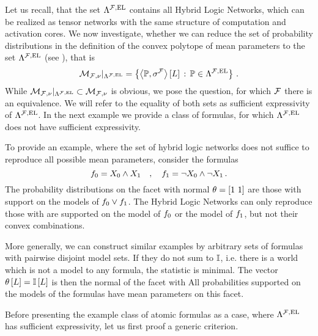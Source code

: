 Let us recall, that the set $\Lambda^{\mathcal{F},\mathrm{EL}}$ contains all Hybrid Logic Networks, which can be realized as tensor networks with the same structure of computation and activation cores.
We now investigate, whether we can reduce the set of probability distributions in the definition of the convex polytope of mean parameters to the set $\Lambda^{\mathcal{F},\mathrm{EL}}$ (see ), that is
\begin{align*}
    \mathcal{M}_{\mathcal{F},\nu}|_{\Lambda^{\mathcal{F},\mathrm{EL}}} = \left\{ \left\langle \mathbb{P},\sigma^{\mathcal{F}}\right\rangle \left[ L \right] \, : \, \mathbb{P}\in\Lambda^{\mathcal{F},\mathrm{EL}} \right\} \, .
\end{align*}
While $\mathcal{M}_{\mathcal{F},\nu}|_{\Lambda^{\mathcal{F},\mathrm{EL}}}\subset\mathcal{M}_{\mathcal{F},\nu}$ is obvious, we pose the question, for which $\mathcal{F}$ there is an equivalence.
We will refer to the equality of both sets as sufficient expressivity of $\Lambda^{\mathcal{F},\mathrm{EL}}$.
In the next example we provide a class of formulas, for which $\Lambda^{\mathcal{F},\mathrm{EL}}$ does not have sufficient expressivity.

\begin{example}
    \label{exa:insufficentHLNsetExpressivity}
    To provide an example, where the set of hybrid logic networks does not suffice to reproduce all possible mean parameters, consider the formulas
    \[ f_{0} = X_{0} \land X_{1} \quad, \quad f_{1} = \lnot X_{0} \land \lnot X_{1} \, . \]
    The probability distributions on the facet with normal $\theta=[1\,\, 1]$ are those with support on the models of $f_{0}\lor f_{1}$.
    The Hybrid Logic Networks can only reproduce those with are supported on the model of $f_{0}$ or the model of $f_{1}$, but not their convex combinations.

    More generally, we can construct similar examples by arbitrary sets of formulas with pairwise disjoint model sets.
    If they do not sum to $\mathbb{I}$, i.e. there is a world which is not a model to any formula, the statistic is minimal.
    The vector $\theta\left[L\right] = \mathbb{I}\left[L\right]$ is then the normal of the facet with
    All probabilities supported on the models of the formulas have mean parameters on this facet.
\end{example}

Before presenting the example class of atomic formulas as a case, where $\Lambda^{\mathcal{F},\mathrm{EL}}$ has sufficient expressivity, let us first proof a generic criterion.

